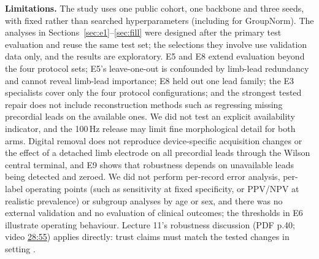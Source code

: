 \textbf{Limitations.} The study uses one public cohort, one backbone and three seeds, with fixed rather than searched hyperparameters (including for GroupNorm). The analyses in Sections~\ref{sec:e1}--\ref{sec:fill} were designed after the primary test evaluation and reuse the same test set; the selections they involve use validation data only, and the results are exploratory. E5 and E8 extend evaluation beyond the four protocol sets; E5's leave-one-out is confounded by limb-lead redundancy and cannot reveal limb-lead importance; E8 held out one lead family; the E3 specialists cover only the four protocol configurations; and the strongest tested repair does not include reconstruction methods such as regressing missing precordial leads on the available ones. We did not test an explicit availability indicator, and the 100\,Hz release may limit fine morphological detail for both arms. Digital removal does not reproduce device-specific acquisition changes or the effect of a detached limb electrode on all precordial leads through the Wilson central terminal, and E9 shows that robustness depends on unavailable leads being detected and zeroed. We did not perform per-record error analysis, per-label operating points (such as sensitivity at fixed specificity, or PPV/NPV at realistic prevalence) or subgroup analyses by age or sex, and there was no external validation and no evaluation of clinical outcomes; the thresholds in E6 illustrate operating behaviour. Lecture 11's robustness discussion (PDF p.40; video \href{https://youtu.be/DDU159QXVzI?t=1735}{28:55}) applies directly: trust claims must match the tested changes in setting \citep{md6329lecture11}.


